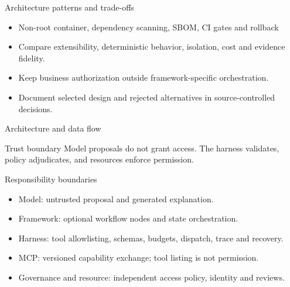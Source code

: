 \documentclass[aspectratio=169,10pt]{beamer}
\begin{document}
\begin{frame}{Architecture patterns and trade-offs}
\small
\begin{itemize}
\item Non-root container, dependency scanning, SBOM, CI gates and rollback
\item Compare extensibility, deterministic behavior, isolation, cost and evidence fidelity.
\item Keep business authorization outside framework-specific orchestration.
\item Document selected design and rejected alternatives in source-controlled decisions.
\end{itemize}

\end{frame}

\begin{frame}{Architecture and data flow}
\small
\centering
{}
\vspace{0.6cm}
\begin{block}{Trust boundary}
Model proposals do not grant access. The harness validates, policy adjudicates, and resources enforce permission.
\end{block}
\end{frame}

\begin{frame}{Responsibility boundaries}
\small
\begin{itemize}
\item Model: untrusted proposal and generated explanation.
\item Framework: optional workflow nodes and state orchestration.
\item Harness: tool allowlisting, schemas, budgets, dispatch, trace and recovery.
\item MCP: versioned capability exchange; tool listing is not permission.
\item Governance and resource: independent access policy, identity and reviews.
\end{itemize}

\end{frame}
\end{document}
